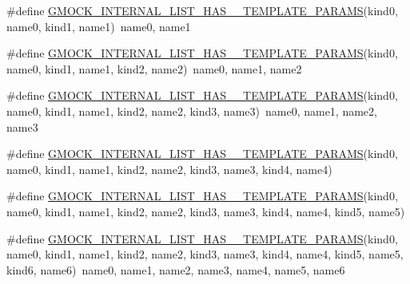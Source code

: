\begin{DoxyCompactItemize}
\item 
\#define \mbox{\hyperlink{_obj__test_2lib_2googletest-master_2googlemock_2include_2gmock_2gmock-generated-actions_8h_ab89cb2aad7a5ededf9397ffd58fb8a9a}{G\+M\+O\+C\+K\+\_\+\+I\+N\+T\+E\+R\+N\+A\+L\+\_\+\+L\+I\+S\+T\+\_\+\+H\+A\+S\+\_\+\_\+\+T\+E\+M\+P\+L\+A\+T\+E\+\_\+\+P\+A\+R\+A\+MS}}(kind0,  name0,  kind1,  name1)~name0, name1
\item 
\#define \mbox{\hyperlink{_obj__test_2lib_2googletest-master_2googlemock_2include_2gmock_2gmock-generated-actions_8h_a1f3bd0693e586000f0b8a5324183b47f}{G\+M\+O\+C\+K\+\_\+\+I\+N\+T\+E\+R\+N\+A\+L\+\_\+\+L\+I\+S\+T\+\_\+\+H\+A\+S\+\_\+\_\+\+T\+E\+M\+P\+L\+A\+T\+E\+\_\+\+P\+A\+R\+A\+MS}}(kind0,  name0,  kind1,  name1,  kind2,  name2)~name0, name1, name2
\item 
\#define \mbox{\hyperlink{_obj__test_2lib_2googletest-master_2googlemock_2include_2gmock_2gmock-generated-actions_8h_a6b509ec43356784c0bb70056dcd2c5a2}{G\+M\+O\+C\+K\+\_\+\+I\+N\+T\+E\+R\+N\+A\+L\+\_\+\+L\+I\+S\+T\+\_\+\+H\+A\+S\+\_\+\_\+\+T\+E\+M\+P\+L\+A\+T\+E\+\_\+\+P\+A\+R\+A\+MS}}(kind0,  name0,  kind1,  name1,  kind2,  name2,  kind3,  name3)~name0, name1, name2, name3
\item 
\#define \mbox{\hyperlink{_obj__test_2lib_2googletest-master_2googlemock_2include_2gmock_2gmock-generated-actions_8h_ad9010efd4cfd9c4874d18fef3aee7676}{G\+M\+O\+C\+K\+\_\+\+I\+N\+T\+E\+R\+N\+A\+L\+\_\+\+L\+I\+S\+T\+\_\+\+H\+A\+S\+\_\+\_\+\+T\+E\+M\+P\+L\+A\+T\+E\+\_\+\+P\+A\+R\+A\+MS}}(kind0,  name0,  kind1,  name1,  kind2,  name2,  kind3,  name3,  kind4,  name4)
\item 
\#define \mbox{\hyperlink{_obj__test_2lib_2googletest-master_2googlemock_2include_2gmock_2gmock-generated-actions_8h_ae9d4c983c2aba6b0fa5725118bb11cbd}{G\+M\+O\+C\+K\+\_\+\+I\+N\+T\+E\+R\+N\+A\+L\+\_\+\+L\+I\+S\+T\+\_\+\+H\+A\+S\+\_\+\_\+\+T\+E\+M\+P\+L\+A\+T\+E\+\_\+\+P\+A\+R\+A\+MS}}(kind0,  name0,  kind1,  name1,  kind2,  name2,  kind3,  name3,  kind4,  name4,  kind5,  name5)
\item 
\#define \mbox{\hyperlink{_obj__test_2lib_2googletest-master_2googlemock_2include_2gmock_2gmock-generated-actions_8h_ad76d91a49b437e52790b3d7efeb6f289}{G\+M\+O\+C\+K\+\_\+\+I\+N\+T\+E\+R\+N\+A\+L\+\_\+\+L\+I\+S\+T\+\_\+\+H\+A\+S\+\_\+\_\+\+T\+E\+M\+P\+L\+A\+T\+E\+\_\+\+P\+A\+R\+A\+MS}}(kind0,  name0,  kind1,  name1,  kind2,  name2,  kind3,  name3,  kind4,  name4,  kind5,  name5,  kind6,  name6)~name0, name1, name2, name3, name4, name5, name6
\item 

\end{DoxyCompactItemize}
